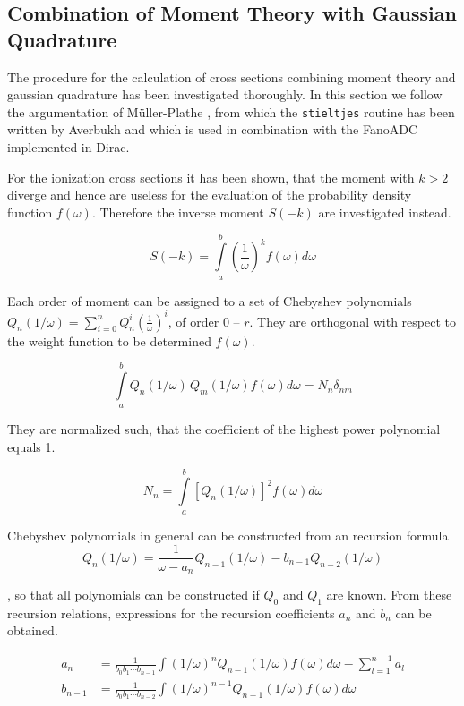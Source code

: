\subsection{Combination of Moment Theory with Gaussian Quadrature}
The procedure for the calculation of cross sections combining moment
theory and gaussian quadrature has been investigated thoroughly. In this section
we follow the argumentation of Müller-Plathe \cite{}, from which the
\verb|stieltjes| routine has been written by Averbukh and which is used in
combination with the FanoADC implemented in Dirac.

For the ionization cross sections it has been shown, that the moment with
$k>2$ diverge and hence are useless for the evaluation of the probability
density function $f(\omega)$. Therefore the inverse moment $S(-k)$ are investigated
instead.

\begin{equation}
  S(-k) = \int\limits_a^b \left( \frac{1}{\omega} \right) ^k f(\omega) d\omega
\end{equation}

Each order of moment can be assigned to a set of Chebyshev polynomials
$Q_n (1/\omega) = \sum\limits_{i=0}^n Q_n^{i}\left( \frac{1}{\omega} \right)^{i}$,
of order $0$ -- $r$. They are orthogonal with respect to the weight function
to be determined $f(\omega)$.

\begin{equation}
  \int\limits_a^b Q_n(1/\omega) \, Q_m(1/\omega) f(\omega) d\omega = N_n \delta_{nm}
\end{equation}

They are normalized such, that the coefficient of the highest power polynomial
equals 1.

\begin{equation}
  N_n = \int\limits_a^b \left[ Q_n(1/\omega) \right]^2 f(\omega) d\omega
\end{equation}

Chebyshev polynomials in general can be constructed from an recursion formula
\begin{equation}
  Q_n(1/\omega) = \frac{1}{\omega - a_n} Q_{n-1}(1/\omega) - b_{n-1} Q_{n-2}(1/\omega)
\end{equation}

, so that all polynomials can be constructed if $Q_0$ and $Q_1$ are known.
From these recursion relations, expressions for the recursion coefficients
$a_n$ and $b_n$ can be obtained.

\begin{align}
  a_n     &= \frac{1}{b_0b_1\cdots b_{n-1}}
             \int (1/\omega)^n Q_{n-1}(1/\omega) f(\omega) d\omega
             - \sum\limits_{l=1}^{n-1} a_l  \label{equation:an_cont}\\
  b_{n-1} &= \frac{1}{b_0b_1\cdots b_{n-2}}
             \int (1/\omega)^{n-1} Q_{n-1}(1/\omega) f(\omega) d\omega \label{equation:bn_cont}
\end{align}

